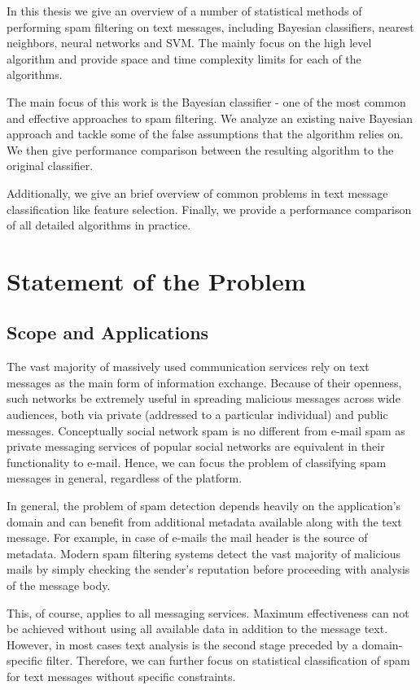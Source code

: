 \documentclass[12pt]{report}
\begin{document}
In this thesis we give an overview of a number of statistical methods of performing spam filtering on text messages, including Bayesian classifiers, nearest neighbors, neural networks and SVM. The mainly focus on the high level algorithm and provide space and time complexity limits for each of the algorithms.

The main focus of this work is the Bayesian classifier - one of the most common and effective approaches to spam filtering. We analyze an existing naive Bayesian approach and tackle some of the false assumptions that the algorithm relies on. We then give performance comparison between the resulting algorithm to the original classifier.

Additionally, we give an brief overview of common problems in text message classification like feature selection. Finally, we provide a performance comparison of all detailed algorithms in practice.

\newpage


\chapter{Statement of the Problem}

\section{Scope and Applications}

The vast majority of massively used communication services rely on text messages as the main form of information exchange. Because of their openness, such networks be extremely useful in spreading malicious messages across wide audiences, both via private (addressed to a particular individual) and public messages. Conceptually social network spam is no different from e-mail spam as private messaging services of popular social networks are equivalent in their functionality to e-mail. Hence, we can focus the problem of classifying spam messages in general, regardless of the platform.

In general, the problem of spam detection depends heavily on the application's domain and can benefit from additional metadata available along with the text message. For example, in case of e-mails the mail header is the source of metadata. Modern spam filtering systems detect the vast majority of malicious mails by simply checking the sender's reputation before proceeding with analysis of the message body.

This, of course, applies to all messaging services. Maximum effectiveness can not be achieved without using all available data in addition to the message text. However, in most cases text analysis is the second stage preceded by a domain-specific filter. Therefore, we can further focus on statistical classification of spam for text messages without specific constraints.
\end{document}
